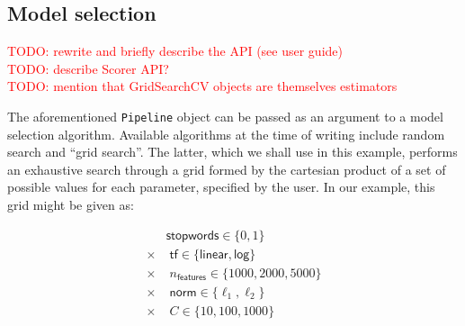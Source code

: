 \documentclass{llncs}
\begin{document}

\subsection{Model selection}

\textcolor{red}{TODO: rewrite and briefly describe the API (see user guide)}\\
\textcolor{red}{TODO: describe Scorer API?}\\
\textcolor{red}{TODO: mention that GridSearchCV objects are themselves estimators}

The aforementioned \texttt{Pipeline} object
can be passed as an argument to a model selection algorithm.
Available algorithms at the time of writing include random search
\citep{bergstra2012} and ``grid search''.
The latter, which we shall use in this example,
performs an exhaustive search through a grid formed by the cartesian product
of a set of possible values for each parameter, specified by the user.
In our example, this grid might be given as:

\begin{align*}
         & \textsf{stopwords} \in \{0, 1\}                      \\
  \times & \; \textsf{tf} \in \{\textsf{linear}, \textsf{log}\} \\
  \times & \; n_\textsf{features} \in \{1000, 2000, 5000\}      \\
  \times & \; \textsf{norm} \in \{\ell_1, \ell_2\}              \\
  \times & \; C \in \{10, 100, 1000\}
\end{align*}
\end{document}
